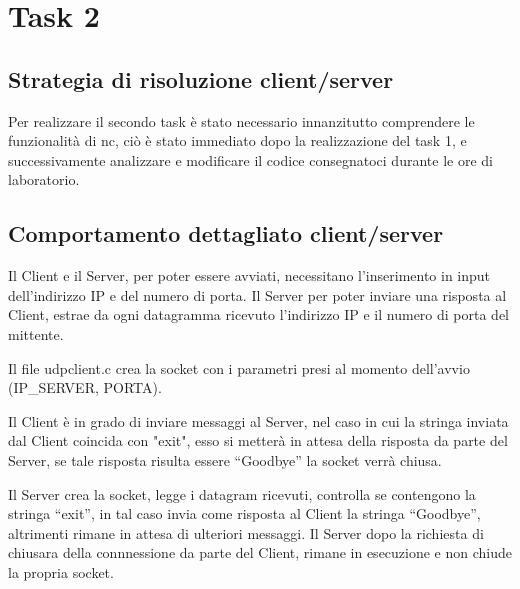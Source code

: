 \documentclass[a4paper]{article}
\begin{document}
\section{Task 2}
\subsection{Strategia di risoluzione client/server}
Per realizzare il secondo task è stato necessario innanzitutto comprendere le funzionalità di nc, ciò è stato immediato dopo la realizzazione del task 1, e successivamente analizzare e modificare il codice consegnatoci durante le ore di laboratorio. 

\subsection{Comportamento dettagliato client/server}
Il Client e il Server, per poter essere avviati, necessitano l’inserimento in input dell’indirizzo IP e del numero di porta. Il Server per poter inviare una risposta al Client, estrae da ogni datagramma ricevuto l’indirizzo IP e il numero di porta del mittente. 
\par Il file udpclient.c crea la socket con i parametri presi al momento dell'avvio (IP\_SERVER, PORTA).\par Il Client è in grado di inviare messaggi al Server, nel caso in cui la stringa inviata dal Client coincida con "exit", esso si metterà in attesa della risposta da parte del Server, se tale risposta risulta essere  “Goodbye” la socket verrà chiusa. 
\par Il Server crea la socket, legge i datagram ricevuti, controlla se contengono la stringa “exit”, in tal caso invia come risposta al Client la stringa “Goodbye”, altrimenti rimane in attesa di ulteriori messaggi. Il Server dopo la richiesta di chiusara della connnessione da parte del Client, rimane in esecuzione e non  chiude la propria socket.
\newpage
\end{document}
